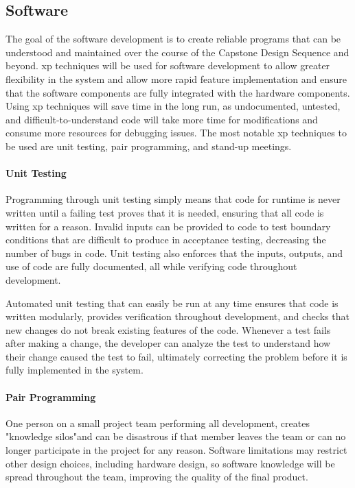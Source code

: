 \subsection{Software}
The goal of the software development is to create reliable programs that can be understood and maintained over the course of the Capstone Design Sequence and beyond.
\gls{xp} techniques will be used for software development to allow greater flexibility in the system and allow more rapid feature implementation and ensure that the software components are fully integrated with the hardware components. 
Using \gls{xp} techniques will save time in the long run, as undocumented, untested, and difficult-to-understand code will take more time for modifications and consume more resources for debugging issues.
The most notable \gls{xp} techniques to be used are unit testing, pair programming, and stand-up meetings.

\paragraph{Unit Testing}
Programming through unit testing simply means that code for runtime is never written until a failing test proves that it is needed, ensuring that all code is written for a reason.
Invalid inputs can be provided to code to test boundary conditions that are difficult to produce in acceptance testing, decreasing the number of bugs in code.
Unit testing also enforces that the inputs, outputs, and use of code are fully documented, all while verifying code throughout development. 

Automated unit testing that can easily be run at any time ensures that code is written modularly, provides verification throughout development, and checks that new changes do not break existing features of the code.
Whenever a test fails after making a change, the developer can analyze the test to understand how their change caused the test to fail, ultimately correcting the problem before it is fully implemented in the system. 
\paragraph{Pair Programming}
One person on a small project team performing all development, creates "knowledge silos"and can be disastrous if that member leaves the team or can no longer participate in the project for any reason.
Software limitations may restrict other design choices, including hardware design, so software knowledge will be spread throughout the team, improving the quality of the final product. 

